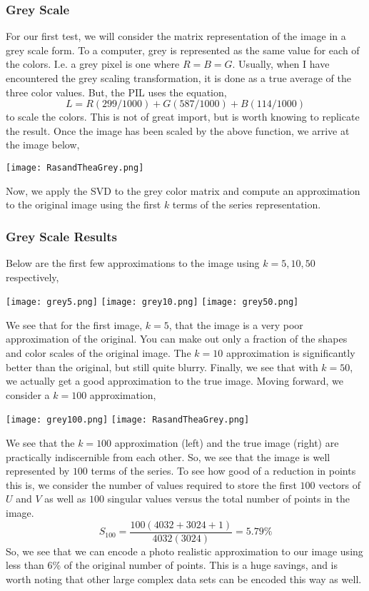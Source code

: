 \documentclass[letterpaper,12pt]{article}
\begin{document}
\subsubsection{Grey Scale}
For our first test, we will consider the matrix representation of the image in a grey scale form. To a computer, grey is represented as the same value for each of the colors. I.e. a grey pixel is one where $R=B=G$. Usually, when I have encountered the grey scaling transformation, it is done as a true average of the three color values. But, the PIL uses the equation,\cite{PIL}
\[L=R(299/1000)+G(587/1000)+B(114/1000)\]
to scale the colors. This is not of great import, but is worth knowing to replicate the result. Once the image has been scaled by the above function, we arrive at the image below,
\begin{center}
\texttt{[image: RasandTheaGrey.png]}
\end{center}
Now, we apply the SVD to the grey color matrix and compute an approximation to the original image using the first $k$ terms of the series representation.
\subsubsection{Grey Scale Results}
Below are the first few approximations to the image using $k=5,10,50$ respectively,
\begin{center}
\texttt{[image: grey5.png]}
\texttt{[image: grey10.png]}
\texttt{[image: grey50.png]}
\end{center}
We see that for the first image, $k=5$, that the image is a very poor approximation of the original. You can make out only a fraction of the shapes and color scales of the original image. The $k=10$ approximation is significantly better than the original, but still quite blurry. Finally, we see that with $k=50$, we actually get a good approximation to the true image. Moving forward, we consider a $k=100$ approximation,
\begin{center}
\texttt{[image: grey100.png]}
\texttt{[image: RasandTheaGrey.png]}
\end{center}
We see that the $k=100$ approximation (left) and the true image (right) are practically indiscernible from each other. So, we see that the image is well represented by $100$ terms of the series. To see how good of a reduction in points this is, we consider the number of values required to store the first $100$ vectors of $U$ and $V$ as well as $100$ singular values versus the total number of points in the image.
\[S_{100}=\frac{100(4032+3024+1)}{4032(3024)}=5.79\%\]
So, we see that we can encode a photo realistic approximation to our image using less than 6\% of the original number of points. This is a huge savings, and is worth noting that other large complex data sets can be encoded this way as well.
\end{document}
